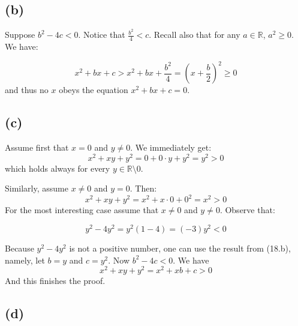 \documentclass{article}
\begin{document}
\subsection*{(b)}

Suppose \(b^{2} - 4c < 0\). Notice that \(\frac{b^{2}}{4} < c\). Recall also that for any \(a \in \mathbb{R}\), \(a^{2} \geq 0\). We have:

\begin{equation*}
	x^{2} + bx + c > x^{2} + bx + \frac{b^{2}}{4} = (x + \frac{b}{2})^{2} \geq 0
\end{equation*}
and thus no \(x\) obeys the equation \(x^{2} + bx + c = 0\).

\subsection*{(c)}

Assume first that \(x = 0\) and \(y \neq 0\). We immediately get:
\begin{equation*}
	x^{2} + xy + y^{2} = 0 + 0 \cdot y + y^{2} = y^{2} > 0 
\end{equation*}
which holds always for every \(y \in \mathbb{R} \setminus 0\).

Similarly, assume \(x \neq 0\) and \(y = 0\). Then:
\begin{equation*}
	x^{2} + xy + y^{2} = x^{2} + x \cdot 0 + 0^{2} = x^{2} > 0
\end{equation*}
For the most interesting case assume that \(x \neq 0\) and \(y \neq 0\). Observe that:

\begin{equation*}
	y^{2} - 4y^{2} = y^{2}(1 - 4) = (-3)y^{2} < 0
\end{equation*}

Because \(y^{2} - 4y^{2}\) is not a positive number, one can use the result from (18.b), namely,
let \(b = y\) and \(c = y^{2}\). Now \(b^{2} - 4c < 0\). We have 
\begin{equation*}
	x^{2} + xy + y^{2} = x^{2} + xb + c > 0
\end{equation*}
And this finishes the proof.

\subsection*{(d)}
\end{document}

